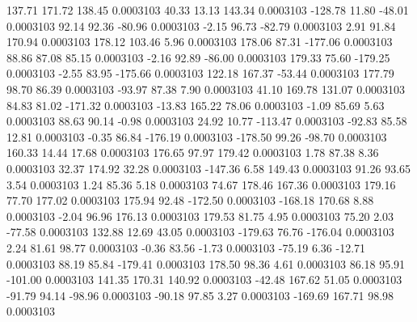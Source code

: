       137.71      171.72      138.45     0.0003103
       40.33       13.13      143.34     0.0003103
     -128.78       11.80      -48.01     0.0003103
       92.14       92.36      -80.96     0.0003103
       -2.15       96.73      -82.79     0.0003103
        2.91       91.84      170.94     0.0003103
      178.12      103.46        5.96     0.0003103
      178.06       87.31     -177.06     0.0003103
       88.86       87.08       85.15     0.0003103
       -2.16       92.89      -86.00     0.0003103
      179.33       75.60     -179.25     0.0003103
       -2.55       83.95     -175.66     0.0003103
      122.18      167.37      -53.44     0.0003103
      177.79       98.70       86.39     0.0003103
      -93.97       87.38        7.90     0.0003103
       41.10      169.78      131.07     0.0003103
       84.83       81.02     -171.32     0.0003103
      -13.83      165.22       78.06     0.0003103
       -1.09       85.69        5.63     0.0003103
       88.63       90.14       -0.98     0.0003103
       24.92       10.77     -113.47     0.0003103
      -92.83       85.58       12.81     0.0003103
       -0.35       86.84     -176.19     0.0003103
     -178.50       99.26      -98.70     0.0003103
      160.33       14.44       17.68     0.0003103
      176.65       97.97      179.42     0.0003103
        1.78       87.38        8.36     0.0003103
       32.37      174.92       32.28     0.0003103
     -147.36        6.58      149.43     0.0003103
       91.26       93.65        3.54     0.0003103
        1.24       85.36        5.18     0.0003103
       74.67      178.46      167.36     0.0003103
      179.16       77.70      177.02     0.0003103
      175.94       92.48     -172.50     0.0003103
     -168.18      170.68        8.88     0.0003103
       -2.04       96.96      176.13     0.0003103
      179.53       81.75        4.95     0.0003103
       75.20        2.03      -77.58     0.0003103
      132.88       12.69       43.05     0.0003103
     -179.63       76.76     -176.04     0.0003103
        2.24       81.61       98.77     0.0003103
       -0.36       83.56       -1.73     0.0003103
      -75.19        6.36      -12.71     0.0003103
       88.19       85.84     -179.41     0.0003103
      178.50       98.36        4.61     0.0003103
       86.18       95.91     -101.00     0.0003103
      141.35      170.31      140.92     0.0003103
      -42.48      167.62       51.05     0.0003103
      -91.79       94.14      -98.96     0.0003103
      -90.18       97.85        3.27     0.0003103
     -169.69      167.71       98.98     0.0003103
